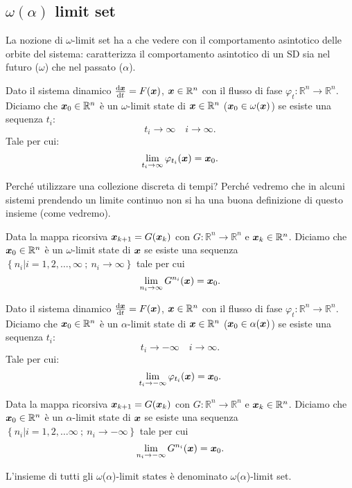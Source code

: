 \subsection{$\omega (\alpha)$ limit set}%
La nozione di $\omega$-limit set ha a che vedere con il comportamento asintotico delle orbite del sistema: caratterizza il comportamento asintotico di un SD sia nel futuro ($\omega$) che nel passato ($\alpha$). 
\begin{defn}
    Dato il sistema dinamico $\frac{\text{d} \boldsymbol{x}}{\text{d} t} = F(\boldsymbol{x})$, $\boldsymbol{x}\in \mathbb{R}^n$ con il flusso di fase $\varphi_t:\mathbb{R}^n\to \mathbb{R}^n$. Diciamo che $\boldsymbol{x}_0\in \mathbb{R}^n$ è un $\omega$-limit state di $\boldsymbol{x}\in \mathbb{R}^n$ ($\boldsymbol{x}_0 \in \omega (\boldsymbol{x})$) se esiste una sequenza $t_i$:
    \[
        t_i \to \infty \quad  i \to \infty
    .\] 
    Tale per cui:
    \[
	\lim_{t_i \to \infty} \varphi_{t_i}(\boldsymbol{x}) = \boldsymbol{x}_0
    .\] 
\end{defn}
\noindent
Perché utilizzare una collezione discreta di tempi? Perché vedremo che in alcuni sistemi prendendo un limite continuo non si ha una buona definizione di questo insieme (come vedremo).
\begin{defn}
    Data la mappa ricorsiva $\boldsymbol{x}_{k+1}=G(\boldsymbol{x}_k)$ con $G:\mathbb{R}^n\to \mathbb{R}^n$ e $\boldsymbol{x}_k \in \mathbb{R}^n$. Diciamo che $\boldsymbol{x}_0 \in \mathbb{R}^n$ è un $\omega$-limit state di $\boldsymbol{x}$ se esiste una sequenza $\left\{n_i|i=1, 2, \ldots, \infty \ ; \ n_i \to \infty\right\}$ tale per cui
    \[
	\lim_{n_i \to \infty} G^{n_i}(\boldsymbol{x}) = \boldsymbol{x}_0
    .\] 
\end{defn}
\noindent
\begin{defn}
    Dato il sistema dinamico $\frac{\text{d} \boldsymbol{x}}{\text{d} t} = F(\boldsymbol{x})$, $\boldsymbol{x}\in \mathbb{R}^n$ con il flusso di fase $\varphi_t:\mathbb{R}^n\to \mathbb{R}^n$. Diciamo che $\boldsymbol{x}_0\in \mathbb{R}^n$ è un $\alpha$-limit state di $\boldsymbol{x}\in \mathbb{R}^n$ ($\boldsymbol{x}_0 \in \alpha (\boldsymbol{x})$) se esiste una sequenza $t_i$:
    \[
        t_i \to -\infty \quad  i \to \infty
    .\] 
    Tale per cui:
    \[
	\lim_{t_i \to -\infty} \varphi_{t_i}(\boldsymbol{x}) = \boldsymbol{x}_0
    .\] 
\end{defn}
\noindent 
\begin{defn}
    Data la mappa ricorsiva $\boldsymbol{x}_{k+1}=G(\boldsymbol{x}_k)$ con $G:\mathbb{R}^n\to \mathbb{R}^n$ e $\boldsymbol{x}_k \in \mathbb{R}^n$. Diciamo che $\boldsymbol{x}_0 \in \mathbb{R}^n$ è un $\alpha$-limit state di $\boldsymbol{x}$ se esiste una sequenza $\left\{n_i|i=1, 2, \ldots \infty \ ; \ n_i \to -\infty\right\}$ tale per cui
    \[
	\lim_{n_i \to -\infty} G^{n_i}(\boldsymbol{x}) = \boldsymbol{x}_0
    .\] 
\end{defn}
\noindent
\begin{defn}
    L'insieme di tutti gli $\omega$($\alpha$)-limit states è denominato $\omega$($\alpha$)-limit set.
\end{defn}
\noindent
